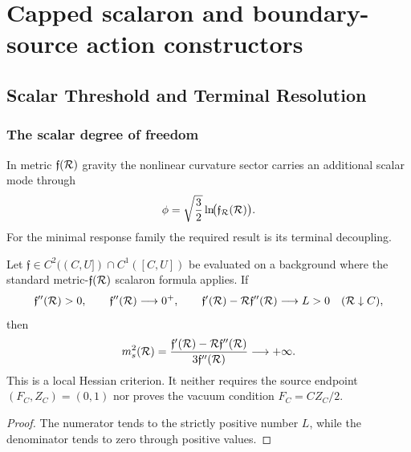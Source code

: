 \documentclass[12pt,a4paper]{article}
\begin{document}
\section{Capped scalaron and boundary-source action constructors}
\label{paper3e:sec:organized-cap}
\subsection{Scalar Threshold and Terminal Resolution}
\label{p3:sec:scalaron}

\subsubsection{The scalar degree of freedom}

In metric \(\mathfrak f(\mathcal R)\) gravity the nonlinear curvature sector carries
an additional scalar mode through
\[
 \phi=\sqrt{\frac32}\ln\!\bigl(\mathfrak f_{\mathcal R}(\mathcal R)\bigr).
\]
For the minimal response family the required result is its
terminal decoupling.

\begin{theorem}
\label{p3e:thm:general-scalaron-decoupling}
Let \(\mathfrak f\in C^2((C,U])\cap C^1([C,U])\) be evaluated on a background
where the standard metric-\(\mathfrak f(\mathcal R)\) scalaron formula applies.
If
\[
 \mathfrak f''(\mathcal R)>0,\qquad
 \mathfrak f''(\mathcal R)\longrightarrow0^+,\qquad
 \mathfrak f'(\mathcal R)-\mathcal R\mathfrak f''(\mathcal R)
 \longrightarrow L>0
 \quad(\mathcal R\downarrow C),
\]
then
\[
 m_s^2(\mathcal R)=
 \frac{\mathfrak f'(\mathcal R)-\mathcal R\mathfrak f''(\mathcal R)}
 {3\mathfrak f''(\mathcal R)}
 \longrightarrow+\infty.
\]
This is a local Hessian criterion.  It neither requires the source endpoint
\((F_C,Z_C)=(0,1)\) nor proves the vacuum condition
\(F_C=CZ_C/2\).
\end{theorem}

\begin{proof}
The numerator tends to the strictly positive number \(L\), while the
denominator tends to zero through positive values.
\end{proof}
\end{document}
